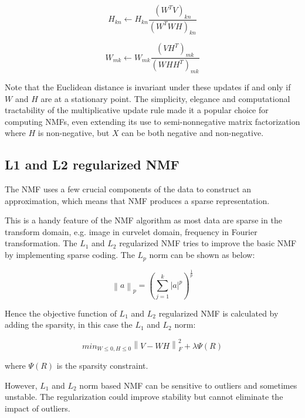 \documentclass{article} %
\begin{document}
\begin{equation}
H_{kn} \gets H_{kn} \frac{\left(W^T V\right)_{kn}}{\left(W^T WH\right)_{kn}}
\end{equation}

\begin{equation}
W_{mk} \gets W_{mk} \frac{\left(V H^T\right)_{mk}}{\left(WH H^T\right)_{mk}}
\end{equation}

Note that the Euclidean distance is invariant under these updates if and only if $W$ and $H$ are at a stationary point. \cite{marques-maciel-naviner-cai-yang} The simplicity, elegance and computational tractability of the multiplicative update rule made it a popular choice for computing NMFs, even extending its use to semi-nonnegative matrix factorization where $H$ is non-negative, but $X$ can be both negative and non-negative. \cite{ding-li-jordan}

\subsection{L1 and L2 regularized NMF}
The NMF uses a few crucial components of the data to construct an approximation, which means that NMF produces a sparse representation. \cite{luo-peng-fan}

This is a handy feature of the NMF algorithm as most data are sparse in the transform domain, e.g. image in curvelet domain, frequency in Fourier transformation. The $L_1$ and $L_2$ regularized NMF tries to improve the basic NMF by implementing sparse coding. The $L_p$ norm can be shown as below:

\begin{equation}
\left\|a\right\|_p = \left(\sum_{j=1}^{k}\left|a\right|^p\right)^{\frac{1}{p}}
\end{equation}

Hence the objective function of $L_1$ and $L_2$ regularized NMF is calculated by adding the sparsity, in this case the $L_1$ and $L_2$ norm:

\begin{equation}
min_{W \leq 0, H \leq 0}\left\|V - WH\right\|_F^2 + \lambda\Psi\left(R\right)
\end{equation}

where $\Psi\left(R\right)$ is the sparsity constraint.

However, $L_1$ and $L_2$ norm based NMF can be sensitive to outliers and sometimes unstable. The regularization could improve stability but cannot eliminate the impact of outliers.
\end{document}
